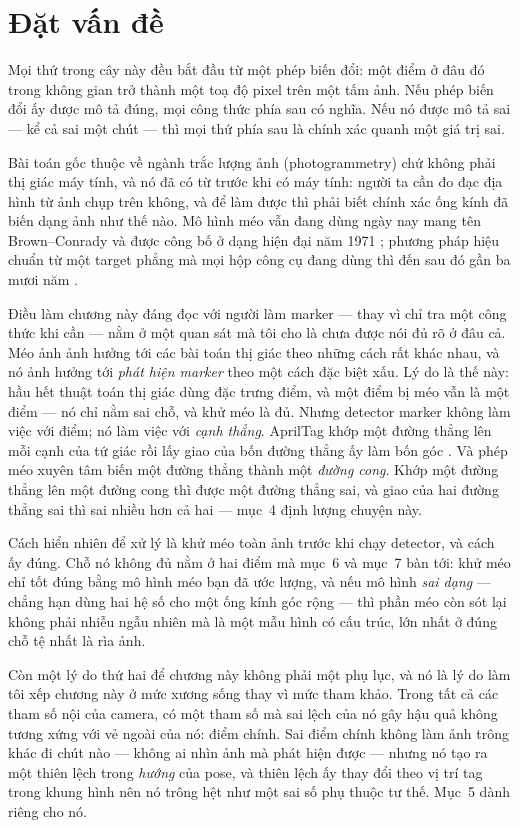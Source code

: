 \documentclass[../../marker.tex]{subfiles}
\begin{document}
\section{Đặt vấn đề}

Mọi thứ trong cây này đều bắt đầu từ một phép biến đổi: một điểm ở đâu đó trong không gian trở thành một toạ độ pixel trên một tấm ảnh. Nếu phép biến đổi ấy được mô tả đúng, mọi công thức phía sau có nghĩa. Nếu nó được mô tả sai --- kể cả sai một chút --- thì mọi thứ phía sau là chính xác quanh một giá trị sai.

Bài toán gốc thuộc về ngành trắc lượng ảnh (photogrammetry) chứ không phải thị giác máy tính, và nó đã có từ trước khi có máy tính: người ta cần đo đạc địa hình từ ảnh chụp trên không, và để làm được thì phải biết chính xác ống kính đã biến dạng ảnh như thế nào. Mô hình méo vẫn đang dùng ngày nay mang tên Brown--Conrady và được công bố ở dạng hiện đại năm 1971 \cite{brown1971close}; phương pháp hiệu chuẩn từ một target phẳng mà mọi hộp công cụ đang dùng thì đến sau đó gần ba mươi năm \cite{zhang2000flexible}.

Điều làm chương này đáng đọc với người làm marker --- thay vì chỉ tra một công thức khi cần --- nằm ở một quan sát mà tôi cho là chưa được nói đủ rõ ở đâu cả. Méo ảnh ảnh hưởng tới các bài toán thị giác theo những cách rất khác nhau, và nó ảnh hưởng tới \emph{phát hiện marker} theo một cách đặc biệt xấu. Lý do là thế này: hầu hết thuật toán thị giác dùng đặc trưng điểm, và một điểm bị méo vẫn là một điểm --- nó chỉ nằm sai chỗ, và khử méo là đủ. Nhưng detector marker không làm việc với điểm; nó làm việc với \emph{cạnh thẳng}. AprilTag khớp một đường thẳng lên mỗi cạnh của tứ giác rồi lấy giao của bốn đường thẳng ấy làm bốn góc \cite{wang2016apriltag2}. Và phép méo xuyên tâm biến một đường thẳng thành một \emph{đường cong}. Khớp một đường thẳng lên một đường cong thì được một đường thẳng sai, và giao của hai đường thẳng sai thì sai nhiều hơn cả hai --- mục~4 định lượng chuyện này.

Cách hiển nhiên để xử lý là khử méo toàn ảnh trước khi chạy detector, và cách ấy đúng. Chỗ nó không đủ nằm ở hai điểm mà mục~6 và mục~7 bàn tới: khử méo chỉ tốt đúng bằng mô hình méo bạn đã ước lượng, và nếu mô hình \emph{sai dạng} --- chẳng hạn dùng hai hệ số cho một ống kính góc rộng --- thì phần méo còn sót lại không phải nhiễu ngẫu nhiên mà là một mẫu hình có cấu trúc, lớn nhất ở đúng chỗ tệ nhất là rìa ảnh.

Còn một lý do thứ hai để chương này không phải một phụ lục, và nó là lý do làm tôi xếp chương này ở mức xương sống thay vì mức tham khảo. Trong tất cả các tham số nội của camera, có một tham số mà sai lệch của nó gây hậu quả không tương xứng với vẻ ngoài của nó: điểm chính. Sai điểm chính không làm ảnh trông khác đi chút nào --- không ai nhìn ảnh mà phát hiện được --- nhưng nó tạo ra một thiên lệch trong \emph{hướng} của pose, và thiên lệch ấy thay đổi theo vị trí tag trong khung hình nên nó trông hệt như một sai số phụ thuộc tư thế. Mục~5 dành riêng cho nó.
\end{document}
